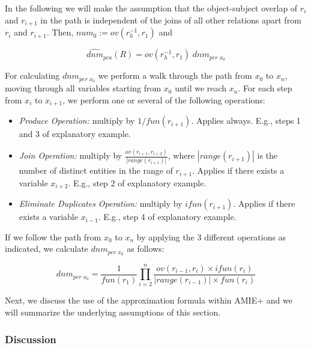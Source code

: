 {{In the following we will make the assumption that the object-subject overlap of $r_{i}$ and $r_{i+1}$ in the path is independent of the joins of all other relations apart from $r_{i}$ and $r_{i+1}$.
Then, $num_0:=ov(r_h^{-1},r_1)$ and

\begin{equation} \label{eq:pcaApproxDenom}
   \widehat{dnm}_{pca}(R) = ov(r_h^{-1},r_1) \; dnm_{per\; x_0}
\end{equation}


For calculating $dnm_{per\; x_0}$ we perform a walk through the path from $x_0$ to $x_n$, moving through all variables starting from $x_0$ until we reach $x_n$.
For each step from $x_i$ to $x_{i+1}$, we perform one or several of the following operations:

\begin{itemize}
 \item \emph{Produce Operation:} multiply by $1/fun(r_{i+1})$. Applies always. E.g., steps 1 and 3 of explanatory example.
 \item \emph{Join Operation:} multiply by $\frac{ov(r_{i+1}, r_{i+2})}{|range(r_{i+1})|}$, where $|range(r_{i+1})|$ is the number of distinct entities in the range of $r_{i+1}$.
Applies if there exists a variable $x_{i+2}$. E.g., step 2   of explanatory example.
 \item \emph{Eliminate Duplicates Operation:} multiply by $ifun(r_{i+1})$. Applies if there exists a variable $x_{i-1}$.  E.g., step 4   of explanatory example.
\end{itemize}

If we follow the path from $x_0$ to $x_n$ by applying  the 3 different operations as indicated, we calculate $dnm_{per\; x_0}$ as follows:

\begin{equation} \label{eq:pcaApproxDenomPerX0}
 dnm_{per\; x_0}= \frac{1}{fun(r_1)} \prod_{i=2}^n \frac{ov(r_{i-1},r_i) \times ifun(r_i)}{|range(r_{i-1})| \times fun(r_i)}
\end{equation}

Next, we discuss the use of the approximation formula within AMIE+ and we will summarize the underlying assumptions of this section.

}

\subsubsection{Discussion}

}

